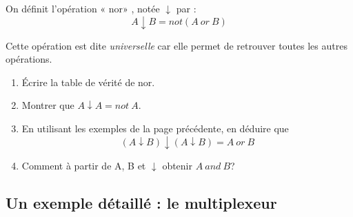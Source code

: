 \begin{exercice}[]
    On définit l'opération « nor» , notée $\downarrow$ par : $$A\downarrow B = not(A\ or\ B)$$

    Cette opération est dite \textit{universelle} car elle permet de retrouver toutes les autres opérations.

    \begin{enumerate}
        \item 	\'Ecrire la table de vérité de nor.
        \item 	Montrer que $A\downarrow A = not\ A$.
        \item 	En utilisant les exemples de la page précédente, en déduire que $$(A\downarrow B)\downarrow(A\downarrow B) = A\ or\ B$$
        \item 	Comment à partir de A, B et $\downarrow$ obtenir $A\ and\ B$?
    \end{enumerate}
\end{exercice}

\subsection{Un exemple détaillé : le multiplexeur}

